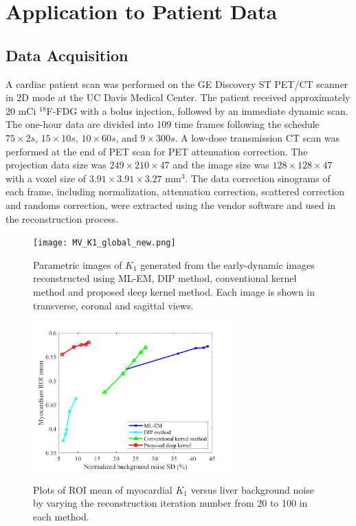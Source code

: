 \documentclass[]{IEEETran}
\begin{document}
	\section{Application to Patient Data}
	
	\subsection{Data Acquisition}
	
	A cardiac patient scan was performed on the GE Discovery ST PET/CT scanner in 2D mode at the UC Davis Medical Center. The patient received approximately 20 mCi $^{18}$F-FDG with a bolus injection, followed by an immediate dynamic scan. The one-hour data are divided into 109 time frames following the schedule $75 \times 2s$, $15 \times 10s$, $10 \times 60s$, and $9 \times 300s$. A low-dose transmission CT scan was performed at the end of PET scan for PET attenuation correction. The projection data size was $249\times210\times47$ and the image size was $128\times128\times47$ with a voxel size of $3.91\times3.91\times3.27$ mm$^3$. The data correction sinograms of each frame, including normalization, attenuation correction, scattered correction and randoms correction, were extracted using the vendor software and used in the reconstruction process. 
	
	\begin{figure}[t]
		\vspace{-0pt}
		\centering
		{\texttt{[image: MV\_K1\_global\_new.png]}
			\label{fig_1_case}}
		\caption{Parametric images of $K_1$ generated from the early-dynamic images reconstructed using ML-EM, DIP method,  conventional kernel method and proposed deep kernel method. Each image is shown in transverse, coronal and sagittal views.}
		\label{K1 image}
	\end{figure} 
	\begin{figure}[h]
		\vspace{-0pt}
		\centering
		{\includegraphics[trim=0cm 0cm 1cm 0cm, clip,width=3in]{B_vs_SD_new.png}
			\label{fig_1_case}}
		\caption{Plots of ROI mean of myocardial $K_1$ versus liver background noise by varying the reconstruction iteration number from 20 to 100 in each method.}
		\label{CRC_K1}
	\end{figure}
\end{document}
